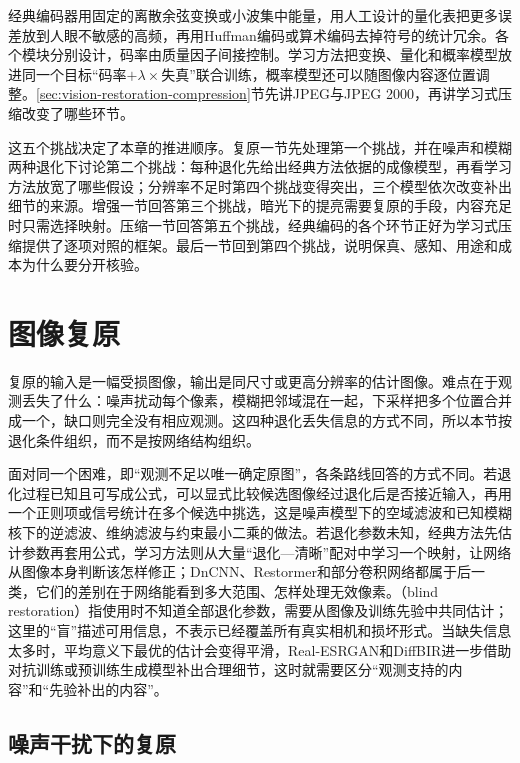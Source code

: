 经典编码器用固定的离散余弦变换或小波集中能量，用人工设计的量化表把更多误差放到人眼不敏感的高频，再用Huffman编码或算术编码去掉符号的统计冗余。各个模块分别设计，码率由质量因子间接控制。学习方法把变换、量化和概率模型放进同一个目标“码率$+\lambda\times$失真”联合训练，概率模型还可以随图像内容逐位置调整。\ref{sec:vision-restoration-compression}节先讲JPEG与JPEG 2000，再讲学习式压缩改变了哪些环节。

这五个挑战决定了本章的推进顺序。复原一节先处理第一个挑战，并在噪声和模糊两种退化下讨论第二个挑战：每种退化先给出经典方法依据的成像模型，再看学习方法放宽了哪些假设；分辨率不足时第四个挑战变得突出，三个模型依次改变补出细节的来源。增强一节回答第三个挑战，暗光下的提亮需要复原的手段，内容充足时只需选择映射。压缩一节回答第五个挑战，经典编码的各个环节正好为学习式压缩提供了逐项对照的框架。最后一节回到第四个挑战，说明保真、感知、用途和成本为什么要分开核验。

\section{图像复原}
\label{sec:vision-restoration-restoration}

复原的输入是一幅受损图像，输出是同尺寸或更高分辨率的估计图像。难点在于观测丢失了什么：噪声扰动每个像素，模糊把邻域混在一起，下采样把多个位置合并成一个，缺口则完全没有相应观测。这四种退化丢失信息的方式不同，所以本节按退化条件组织，而不是按网络结构组织。

面对同一个困难，即“观测不足以唯一确定原图”，各条路线回答的方式不同。若退化过程已知且可写成公式，可以显式比较候选图像经过退化后是否接近输入，再用一个正则项或信号统计在多个候选中挑选，这是噪声模型下的空域滤波和已知模糊核下的逆滤波、维纳滤波与约束最小二乘的做法。若退化参数未知，经典方法先估计参数再套用公式，学习方法则从大量“退化—清晰”配对中学习一个映射，让网络从图像本身判断该怎样修正；DnCNN、Restormer和部分卷积网络都属于后一类，它们的差别在于网络能看到多大范围、怎样处理无效像素。（blind restoration）指使用时不知道全部退化参数，需要从图像及训练先验中共同估计；这里的“盲”描述可用信息，不表示已经覆盖所有真实相机和损坏形式。当缺失信息太多时，平均意义下最优的估计会变得平滑，Real-ESRGAN和DiffBIR进一步借助对抗训练或预训练生成模型补出合理细节，这时就需要区分“观测支持的内容”和“先验补出的内容”。

\subsection{噪声干扰下的复原}
\label{sec:vision-restoration-denoising}
\label{sec:vision-restoration-dncnn}

